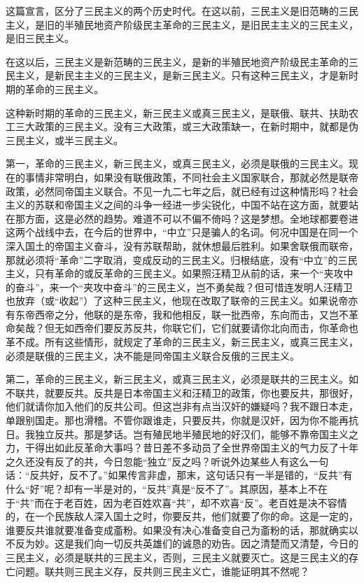 这篇宣言，区分了三民主义的两个历史时代。在这以前，三民主义是旧范畴的三民主义，是旧的半殖民地资产阶级民主革命的三民主义，是旧民主主义的三民主义，是旧三民主义。

在这以后，三民主义是新范畴的三民主义，是新的半殖民地资产阶级民主革命的三民主义，是新民主主义的三民主义，是新三民主义。只有这种三民主义，才是新时期的革命的三民主义。

这种新时期的革命的三民主义，新三民主义或真三民主义，是联俄、联共、扶助农工三大政策的三民主义。没有三大政策，或三大政策缺一，在新时期中，就都是伪三民主义，或半三民主义。

第一，革命的三民主义，新三民主义，或真三民主义，必须是联俄的三民主义。现在的事情非常明白，如果没有联俄政策，不同社会主义国家联合，那就必然是联帝政策，必然同帝国主义联合。不见一九二七年之后，就已经有过这种情形吗？社会主义的苏联和帝国主义之间的斗争一经进一步尖锐化，中国不站在这方面，就要站在那方面，这是必然的趋势。难道不可以不偏不倚吗？这是梦想。全地球都要卷进这两个战线中去，在今后的世界中，“中立”只是骗人的名词。何况中国是在同一个深入国土的帝国主义奋斗，没有苏联帮助，就休想最后胜利。如果舍联俄而联帝，那就必须将“革命”二字取消，变成反动的三民主义。归根结底，没有“中立”的三民主义，只有革命的或反革命的三民主义。如果照汪精卫从前的话，来一个“夹攻中的奋斗”，来一个“夹攻中奋斗”的三民主义，岂不勇矣哉？但可惜连发明人汪精卫也放弃（或“收起”）了这种三民主义，他现在改取了联帝的三民主义。如果说帝亦有东帝西帝之分，他联的是东帝，我和他相反，联一批西帝，东向而击，又岂不革命矣哉？但无如西帝们要反苏反共，你联它们，它们就要请你北向而击，你革命也革不成。所有这些情形，就规定了革命的三民主义，新三民主义，或真三民主义，必须是联俄的三民主义，决不能是同帝国主义联合反俄的三民主义。

第二，革命的三民主义，新三民主义，或真三民主义，必须是联共的三民主义。如不联共，就要反共。反共是日本帝国主义和汪精卫的政策，你也要反共，那很好，他们就请你加入他们的反共公司。但这岂非有点当汉奸的嫌疑吗？我不跟日本走，单跟别国走。那也滑稽。不管你跟谁走，只要反共，你就是汉奸，因为你不能再抗日。我独立反共。那是梦话。岂有殖民地半殖民地的好汉们，能够不靠帝国主义之力，干得出如此反革命大事吗？昔日差不多动员了全世界帝国主义的气力反了十年之久还没有反了的共，今日忽能“独立”反之吗？听说外边某些人有这么一句话：“反共好，反不了。”如果传言非虚，那末，这句话只有一半是错的，“反共”有什么“好”呢？却有一半是对的，“反共”真是“反不了”。其原因，基本上不在于“共”而在于老百姓，因为老百姓欢喜“共”，却不欢喜“反”。老百姓是决不容情的，在一个民族敌人深入国土之时，你要反共，他们就要了你的命。这是一定的，谁要反共谁就要准备变成齑粉。如果没有决心准备变自己为齑粉的话，那就确实以不反为妙。这是我们向一切反共英雄们的诚恳的劝告。因之清楚而又清楚，今日的三民主义，必须是联共的三民主义，否则，三民主义就要灭亡。这是三民主义的存亡问题。联共则三民主义存，反共则三民主义亡，谁能证明其不然呢？

